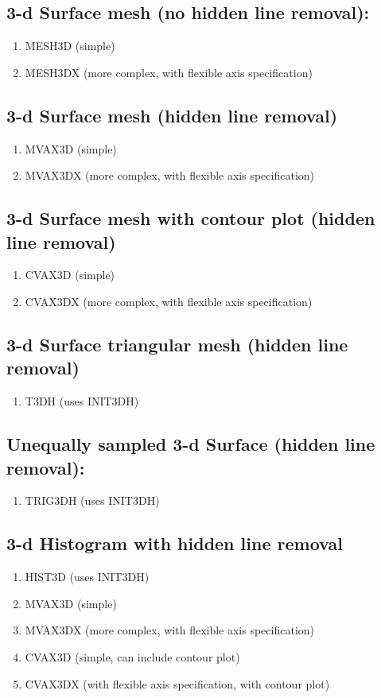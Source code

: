 \documentclass[11pt]{report}
\begin{document}
\subsection{3-d Surface mesh (no hidden line removal):}
\begin{enumerate}
\item  MESH3D  (simple)
\item  MESH3DX (more complex, with flexible axis specification)
\end{enumerate}

\subsection{3-d Surface mesh (hidden line removal)}
\begin{enumerate}
\item  MVAX3D  (simple)
\item  MVAX3DX (more complex, with flexible axis specification)
\end{enumerate}

\subsection{3-d Surface mesh with contour plot (hidden line removal)}
\begin{enumerate}
\item  CVAX3D  (simple)
\item  CVAX3DX (more complex, with flexible axis specification)
\end{enumerate}

\subsection{3-d Surface triangular mesh (hidden line removal)}
\begin{enumerate}
\item  T3DH (uses INIT3DH)
\end{enumerate}

\subsection{Unequally sampled 3-d Surface (hidden line removal):}
\begin{enumerate}
\item  TRIG3DH (uses INIT3DH)
\end{enumerate}

\subsection{3-d Histogram with hidden line removal}
\begin{enumerate}
\item  HIST3D (uses INIT3DH)
\item  MVAX3D (simple)
\item  MVAX3DX (more complex, with flexible axis specification)
\item  CVAX3D (simple, can include contour plot)
\item  CVAX3DX (with flexible axis specification, with contour plot)
\end{enumerate}
\end{document}
